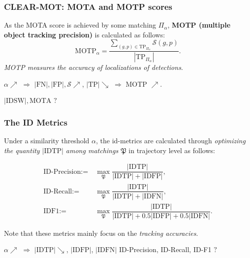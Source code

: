 \documentclass[slidetop, mathserif, dvipsnames]{beamer}
\begin{document}
\begin{frame}
	\frametitle{CLEAR-MOT: MOTA and MOTP scores}
			
	As the MOTA score is achieved by some matching $\Pi_\alpha$, {\bf MOTP (multiple object tracking precision)}
	is calculated as follows:
	\[
		\text{MOTP}_\alpha =
		\dfrac{\sum_{(g,p)\in\text{TP}_{\Pi_\alpha}}\mathcal S(g,p)}{|\text{TP}_{\Pi_\alpha}|}.
	\]
	\emph{\color{red} MOTP measures the accuracy of localizations of detections}.
			
	\quad
			
			
	\vspace{5pt}
		
	$\alpha\nearrow$ $\Rightarrow$ $|\text{FN}|, |\text{FP}|, \mathcal S \nearrow$,
	$|\text{TP}| \searrow$ $\Rightarrow$ MOTP $\nearrow$.

	\vspace{5pt}

	$|\text{IDSW}|, \text{MOTA}$ $?$
	
\end{frame}

\begin{frame}
	\frametitle{The ID Metrics}
			
	Under a similarity threshold $\alpha$, the id-metrics are calculated through
	\emph{optimizing the quantity $|\text{IDTP}|$ among matchings $\mathfrak P$}
	in trajectory level as follows:

	\vspace{-15pt}
	\begin{align*}
		\text{ID-Precision} := & ~ \max_{\mathfrak P} \dfrac{|\text{IDTP}|}{|\text{IDTP}| + |\text{IDFP}|}, \\
		\text{ID-Recall} :=    & ~ \max_{\mathfrak P}\dfrac{|\text{IDTP}|}{|\text{IDTP}| + |\text{IDFN}|},  \\
		\text{IDF1} :=         &                                                                            
		~ \max_{\mathfrak P}\dfrac{|\text{IDTP}|}{|\text{IDTP}| + 0.5|\text{IDFP}| + 0.5|\text{IDFN}|}.
	\end{align*}

	Note that these metrics mainly focus on the {\color{olive}\emph{tracking accuracies}}.

	\vspace{5pt}

	$\alpha\nearrow$ $\Rightarrow$ $|\text{IDTP}|\searrow$,
	$|\text{IDFP}|$, $|\text{IDFN}|$ ID-Precision, ID-Recall, ID-F1 $?$

\end{frame}
\end{document}

